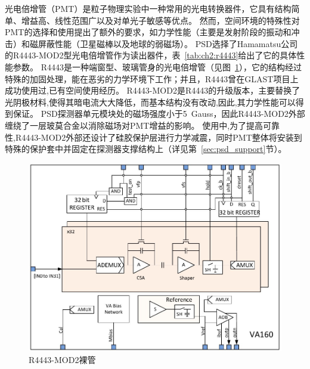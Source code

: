 光电倍增管（PMT）是粒子物理实验中一种常用的光电转换器件，它具有结构简单、增益高、线性范围广以及对单光子敏感等优点。
然而，空间环境的特殊性对PMT的选择和使用提出了额外的要求，如力学性能（主要是发射阶段的振动和冲击）和磁屏蔽性能（卫星磁棒以及地球的弱磁场）。
PSD选择了Hamamatsu公司的R4443-MOD2型光电倍增管作为读出器件，表~\ref{tab:ch2:r4443}给出了它的具体性能参数。
R4443是一种端窗型、玻璃管身的光电倍增管（见图~\ref{fig:ch2:r4443_rare}），它的结构经过特殊的加固处理，能在恶劣的力学环境下工作；并且，R4443曾在GLAST项目上成功使用过,已有空间使用经历。
R4443-MOD2是R4443的升级版本，主要替换了光阴极材料,使得其暗电流大大降低，而基本结构没有改动,因此,其力学性能可以得到保证。
PSD探测器单元模块处的磁场强度小于\SI{5}{Gauss}，因此R4443-MOD2外部缠绕了一层玻莫合金以消除磁场对PMT增益的影响。
使用中,为了提高可靠性,R4443-MOD2外部还设计了硅胶保护层进行力学减震，同时PMT整体将安装到特殊的保护套中并固定在探测器支撑结构上（详见第~\ref{sec:psd_support}节）。

\begin{figure}[h!]
\centering
\includegraphics[width=0.8\linewidth]{chap/description/fig/va160}
\caption{R4443-MOD2裸管}
\label{fig:ch2:r4443_rare}
\end{figure}

